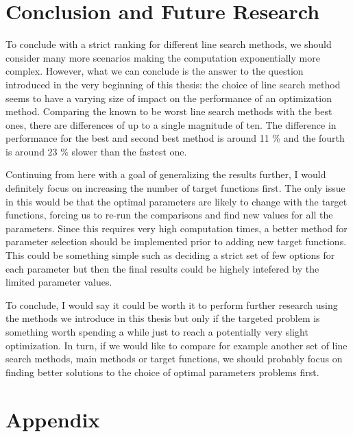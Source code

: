 \documentclass[a4paper,english,titlepage,12pt]{article}
\begin{document}



\section{Conclusion and Future Research}

To conclude with a strict ranking for different line search methods, we should consider many more scenarios making the computation exponentially more complex. However, what we can conclude is the answer to the question introduced in the very beginning of this thesis: the choice of line search method seems to have a varying size of impact on the performance of an optimization method. Comparing the known to be worst line search methods with the best ones, there are differences of up to a single magnitude of ten. The difference in performance for the best and second best method is around 11 \% and the fourth is around 23 \% slower than the fastest one.

Continuing from here with a goal of generalizing the results further, I would definitely focus on increasing the number of target functions first. The only issue in this would be that the optimal parameters are likely to change with the target functions, forcing us to re-run the comparisons and find new values for all the parameters. Since this requires very high computation times, a better method for parameter selection should be implemented prior to adding new target functions. This could be something simple such as deciding a strict set of few options for each parameter but then the final results could be highely intefered by the limited parameter values.

To conclude, I would say it could be worth it to perform further research using the methods we introduce in this thesis but only if the targeted problem is something worth spending a while just to reach a potentially very slight optimization. In turn, if we would like to compare for example another set of line search methods, main methods or target functions, we should probably focus on finding better solutions to the choice of optimal parameters problems first.

\newpage
% 






\newpage
\appendix
\section{Appendix}

\end{document}
